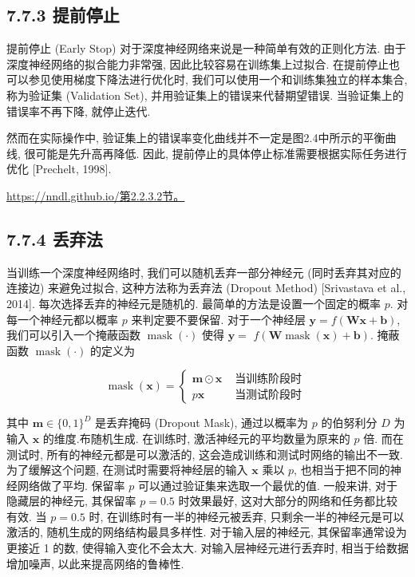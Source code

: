 \documentclass[10pt]{article}
\begin{document}
\subsection*{7.7.3 提前停止}
提前停止 (Early Stop) 对于深度神经网络来说是一种简单有效的正则化方法. 由于深度神经网络的拟合能力非常强, 因此比较容易在训练集上过拟合. 在提前停止也可以参见使用梯度下降法进行优化时, 我们可以使用一个和训练集独立的样本集合, 称为验证集 (Validation Set), 并用验证集上的错误来代替期望错误. 当验证集上的错误率不再下降, 就停止迭代.

然而在实际操作中, 验证集上的错误率变化曲线并不一定是图2.4中所示的平衡曲线, 很可能是先升高再降低. 因此, 提前停止的具体停止标准需要根据实际任务进行优化 [Prechelt, 1998].

\href{https://nndl.github.io/%E7%AC%AC2.2.3.2%E8%8A%82%E3%80%82}{https://nndl.github.io/第2.2.3.2节。}

\subsection*{7.7.4 丢弃法}
当训练一个深度神经网络时, 我们可以随机丢弃一部分神经元 (同时丢弃其对应的连接边) 来避免过拟合, 这种方法称为丢弃法 (Dropout Method) [Srivastava et al., 2014]. 每次选择丢弃的神经元是随机的. 最简单的方法是设置一个固定的概率 $p$. 对每一个神经元都以概率 $p$ 来判定要不要保留. 对于一个神经层 $\boldsymbol{y}=f(\boldsymbol{W} \boldsymbol{x}+\boldsymbol{b})$, 我们可以引入一个掩蔽函数 $\operatorname{mask}(\cdot)$ 使得 $\boldsymbol{y}=$ $f(\boldsymbol{W} \operatorname{mask}(\boldsymbol{x})+\boldsymbol{b})$. 掩蔽函数 $\operatorname{mask}(\cdot)$ 的定义为

\[
\operatorname{mask}(\boldsymbol{x})= \begin{cases}\boldsymbol{m} \odot \boldsymbol{x} & \text { 当训练阶段时 }  \tag{7.74}\\ p \boldsymbol{x} & \text { 当测试阶段时 }\end{cases}
\]

其中 $\boldsymbol{m} \in\{0,1\}^{D}$ 是丢弃掩码 (Dropout Mask), 通过以概率为 $p$ 的伯努利分 $D$ 为输入 $\boldsymbol{x}$ 的维度.布随机生成. 在训练时, 激活神经元的平均数量为原来的 $p$ 倍. 而在测试时, 所有的神经元都是可以激活的, 这会造成训练和测试时网络的输出不一致. 为了缓解这个问题, 在测试时需要将神经层的输入 $\boldsymbol{x}$ 乘以 $p$, 也相当于把不同的神经网络做了平均. 保留率 $p$ 可以通过验证集来选取一个最优的值. 一般来讲, 对于隐藏层的神经元, 其保留率 $p=0.5$ 时效果最好, 这对大部分的网络和任务都比较有效. 当 $p=0.5$ 时, 在训练时有一半的神经元被丢弃, 只剩余一半的神经元是可以激活的, 随机生成的网络结构最具多样性. 对于输入层的神经元, 其保留率通常设为更接近 1 的数, 使得输入变化不会太大. 对输入层神经元进行丢弃时, 相当于给数据增加噪声, 以此来提高网络的鲁棒性.
\end{document}
